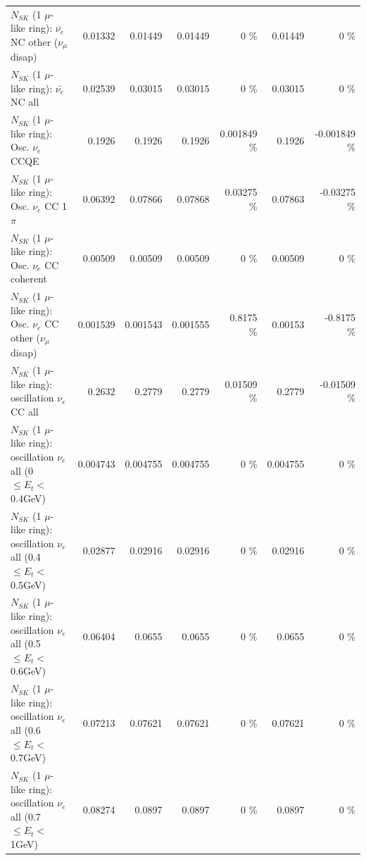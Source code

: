 \begin{table}
\begin{tabular}{| l | r | r | r  r | r  r |}
          $N_{SK}$ (1 $\mu$-like ring): $\bar{\nu_e}$ NC other ($\nu_\mu$ disap) &         0.01332 &         0.01449 &         0.01449 &        0 \%  &         0.01449 &        0 \%  \\ 
                            $N_{SK}$ (1 $\mu$-like ring): $\bar{\nu_{e}}$ NC all &         0.02539 &         0.03015 &         0.03015 &        0 \%  &         0.03015 &        0 \%  \\ 
\hline
\hline
\hline
                                 $N_{SK}$ (1 $\mu$-like ring): Osc. $\nu_e$ CCQE &          0.1926 &          0.1926 &          0.1926 & 0.001849 \%  &          0.1926 & -0.001849 \%  \\ 
                            $N_{SK}$ (1 $\mu$-like ring): Osc. $\nu_e$ CC 1$\pi$ &         0.06392 &         0.07866 &         0.07868 &  0.03275 \%  &         0.07863 & -0.03275 \%  \\ 
                          $N_{SK}$ (1 $\mu$-like ring): Osc. $\nu_e$ CC coherent &         0.00509 &         0.00509 &         0.00509 &        0 \%  &         0.00509 &        0 \%  \\ 
           $N_{SK}$ (1 $\mu$-like ring): Osc. $\nu_e$ CC other ($\nu_\mu$ disap) &        0.001539 &        0.001543 &        0.001555 &   0.8175 \%  &         0.00153 &  -0.8175 \%  \\ 
                        $N_{SK}$ (1 $\mu$-like ring): oscillation $\nu_e$ CC all &          0.2632 &          0.2779 &          0.2779 &  0.01509 \%  &          0.2779 & -0.01509 \%  \\ 
\hline
$N_{SK}$ (1 $\mu$-like ring): oscillation $\nu_{e}$ all (0 $\leq E_{t} <$ 0.4GeV) &        0.004743 &        0.004755 &        0.004755 &        0 \%  &        0.004755 &        0 \%  \\ 
$N_{SK}$ (1 $\mu$-like ring): oscillation $\nu_{e}$ all (0.4 $\leq E_{t} <$ 0.5GeV) &         0.02877 &         0.02916 &         0.02916 &        0 \%  &         0.02916 &        0 \%  \\ 
$N_{SK}$ (1 $\mu$-like ring): oscillation $\nu_{e}$ all (0.5 $\leq E_{t} <$ 0.6GeV) &         0.06404 &          0.0655 &          0.0655 &        0 \%  &          0.0655 &        0 \%  \\ 
$N_{SK}$ (1 $\mu$-like ring): oscillation $\nu_{e}$ all (0.6 $\leq E_{t} <$ 0.7GeV) &         0.07213 &         0.07621 &         0.07621 &        0 \%  &         0.07621 &        0 \%  \\ 
$N_{SK}$ (1 $\mu$-like ring): oscillation $\nu_{e}$ all (0.7 $\leq E_{t} <$ 1GeV) &         0.08274 &          0.0897 &          0.0897 &        0 \%  &          0.0897 &        0 \%  \\ 

\end{tabular}
\end{table}
